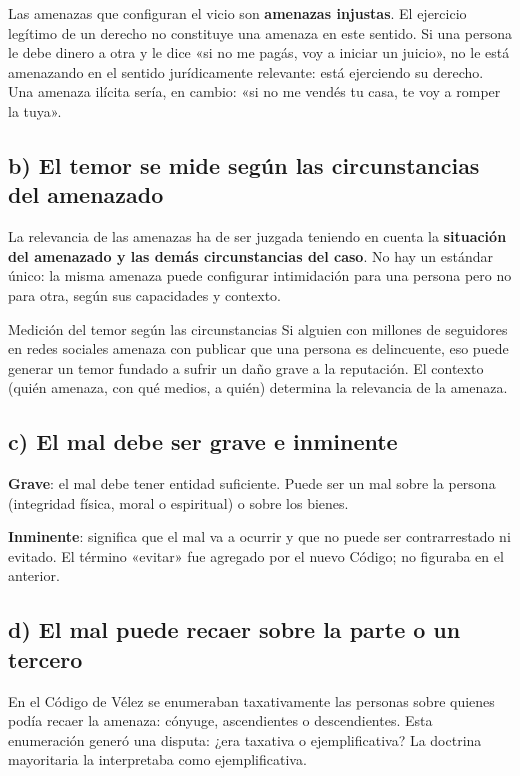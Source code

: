 \documentclass[12pt,oneside]{book}
\begin{document}
Las amenazas que configuran el vicio son \textbf{amenazas injustas}. El ejercicio legítimo de un derecho no constituye una amenaza en este sentido. Si una persona le debe dinero a otra y le dice «si no me pagás, voy a iniciar un juicio», no le está amenazando en el sentido jurídicamente relevante: está ejerciendo su derecho. Una amenaza ilícita sería, en cambio: «si no me vendés tu casa, te voy a romper la tuya».

\subsection*{b) El temor se mide según las circunstancias del amenazado}

La relevancia de las amenazas ha de ser juzgada teniendo en cuenta la \textbf{situación del amenazado y las demás circunstancias del caso}. No hay un estándar único: la misma amenaza puede configurar intimidación para una persona pero no para otra, según sus capacidades y contexto.

\begin{example}{Medición del temor según las circunstancias}
Si alguien con millones de seguidores en redes sociales amenaza con publicar que una persona es delincuente, eso puede generar un temor fundado a sufrir un daño grave a la reputación. El contexto (quién amenaza, con qué medios, a quién) determina la relevancia de la amenaza.
\end{example}

\subsection*{c) El mal debe ser grave e inminente}

\textbf{Grave}: el mal debe tener entidad suficiente. Puede ser un mal sobre la persona (integridad física, moral o espiritual) o sobre los bienes.

\textbf{Inminente}: significa que el mal va a ocurrir y que no puede ser contrarrestado ni evitado. El término «evitar» fue agregado por el nuevo Código; no figuraba en el anterior.

\subsection*{d) El mal puede recaer sobre la parte o un tercero}

En el Código de Vélez se enumeraban taxativamente las personas sobre quienes podía recaer la amenaza: cónyuge, ascendientes o descendientes. Esta enumeración generó una disputa: ¿era taxativa o ejemplificativa? La doctrina mayoritaria la interpretaba como ejemplificativa.
\end{document}
